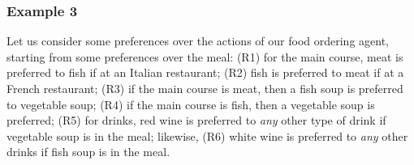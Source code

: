 






\subsubsection*{Example 3}
Let us consider some preferences over the actions of our food ordering agent, starting from some preferences over the meal: (R1) for the main course, meat is preferred to fish if at an Italian restaurant; (R2) fish is preferred to meat if at a French restaurant; (R3) if the main course is meat, then a fish soup is preferred to vegetable soup; (R4) if the main course is fish, then a vegetable soup is preferred; (R5) for drinks, red wine is preferred to \textit{any} other type of drink if vegetable soup is in the meal; likewise, (R6) white wine is preferred to \textit{any} other drinks if fish soup is in the meal. 

